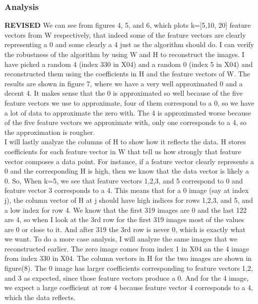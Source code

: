 \documentclass{article}
\begin{document}
\subsubsection*{Analysis}
\textbf{REVISED}
We can see from figures 4, 5, and 6, which plots k=[5,10, 20] feature vectors from W respectively, that indeed some of the feature vectors are clearly representing a 0  and some clearly a 4 just as the algorithm should do.  I can verify the robustness of the algorithm by using W and H to reconstruct the images.  I have picked a random 4 (index 330 in X04) and a random 0 (index 5 in X04) and reconstructed them using the coefficients in H and the feature vectors of W.  The results are shown in figure 7, where we have a very well approximated 0 and a decent 4.  It makes sense that the 0 is approximated so well because of the five feature vectors we use to approximate, four of them correspond to a 0, so we have a lot of data to approximate the zero with.  The 4 is approximated worse because of the five feature vectors we approximate with, only one corresponds to a 4, so the approximation is rougher.  
\\
I will lastly analyze the columns of H to show how it reflects the data.  H stores coefficients for each feature vector in W that tell us how strongly that feature vector composes a data point.  For instance, if a feature vector clearly represents a 0 and the corresponding H is high, then we know that the data vector is likely a 0.  So, When k=5, we see that feature vectors 1,2,3, and 5 correspond to 0 and feature vector 3 corresponds to a 4.  This means that for a 0 image (say at index j), the column vector of H at j should have high indices for rows 1,2,3, and 5, and a low index for row 4.  We know that the first 319 images are 0 and the last 122 are 4, so when I look at the 3rd row for the first 319 images most of the values are 0 or close to it.  And after 319 the 3rd row is never 0, which is exactly what we want.  To do a more case analysis, I will analyze the same images that we reconstructed earlier. The zero image comes from index 1 in X04 an the 4 image from index 330 in X04.  The column vectors in H for the two images are shown in figure(8).  The 0 image has larger coefficients corresponding to feature vectors 1,2, and 3 as expected, since those feature vectors produce a 0.  And for the 4 image, we expect a large coefficient at row 4 because feature vector 4 corresponds to a 4, which the data reflects.
\pagebreak

\pagebreak
\end{document}
